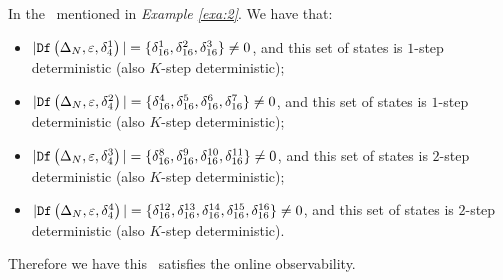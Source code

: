 \begin{example}
In the \BCN\ mentioned in {\em Example \ref{exa:2}}.  We have that:
 \begin{itemize}
 \item $|{\tt Df}\left(\Delta_N,\varepsilon, \delta_{4}^1\right)|=\{\delta_{16}^1,\delta_{16}^2,\delta_{16}^3\}\neq 0$, and this set of states is $1$-step deterministic (also $K$-step deterministic);
 \item $|{\tt Df}\left(\Delta_N,\varepsilon, \delta_{4}^2\right)|=\{\delta_{16}^4,\delta_{16}^5,\delta_{16}^6,\delta_{16}^7\}\neq 0$, and this set of states is $1$-step deterministic (also $K$-step deterministic);
 \item $|{\tt Df}\left(\Delta_N,\varepsilon, \delta_{4}^3\right)|=\{\delta_{16}^8,\delta_{16}^9,\delta_{16}^{10},\delta_{16}^{11}\}\neq 0$, and this set of states is $2$-step deterministic (also $K$-step deterministic);
 \item $|{\tt Df}\left(\Delta_N,\varepsilon, \delta_{4}^4\right)|=\{\delta_{16}^{12},\delta_{16}^{13},\delta_{16}^{14},\delta_{16}^{15},\delta_{16}^{16}\}\neq 0$, and this set of states is $2$-step deterministic (also $K$-step deterministic).
 \end{itemize}
 
Therefore we have this \BCN\ satisfies the online observability.
\end{example}  

